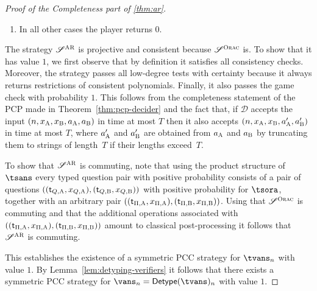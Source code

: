 \documentclass[11pt]{article}
\theoremstyle{definition}
\newcommand{\F}{\ensuremath{\mathbb{F}}}
\newcommand{\decider}{\mathcal{D}}
\newcommand{\strategy}{\mathscr{S}}
\newcommand{\gamestyle}[1]{\ensuremath{\textsc{#1}}\xspace}
\newcommand{\ora}{\gamestyle{Orac}}
\newcommand{\ar}{\gamestyle{AR}}
\newcommand{\labelstyle}[1]{\ensuremath{\textsc{#1}}\xspace}
\newcommand{\tvarstyle}[1]{\mathsf{#1}}
\newcommand{\tvar}{\ensuremath{\tvarstyle{t}}}
\newcommand{\alice}{\labelstyle{A}}
\newcommand{\bob}{\labelstyle{B}}
\newcommand{\typestyle}[1]{\ensuremath{\textsc{#1}}\xspace}
\newcommand{\Point}{\typestyle{Point}}
\newcommand{\ALine}{\typestyle{ALine}}
\newcommand{\DLine}{\typestyle{DLine}}
\newcommand{\tmstyle}[1]{\ensuremath{\mathsf{#1}}}
\newcommand{\detype}{\tmstyle{Detype}}
\begin{document}
\begin{proof}[Proof of the Completeness part of \cref{thm:ar}]
\begin{enumerate}
\begin{enumerate}
\begin{enumerate}
        $\DLine_i$ instead of $\ALine_i$) for $i \in \{1, \dots, 5\}$, the
        player returns the restriction of $g_i$ to the axis-parallel line (resp.
        diagonal line) of $\F_q^{m}$ specified by $x_\Pi$.
      \item If $\tvar_\Pi \in \{\Point_6, \ALine_6\}$ (resp.
        $\DLine_6$ instead of $\ALine_6$), the player returns the restriction of
        all the polynomials $g_1, \dots, g_5,$ $c_0, \dots, c_{m'}$ to the
        axis-parallel line of $\F_q^{m'}$ (resp.
        the diagonal line) specified by $x_\Pi$.
      \end{enumerate}
    \item In all other cases the player returns $0$.
    \end{enumerate}
  \end{enumerate}
  The strategy $\strategy^\ar$ is projective and consistent because $\strategy^\ora$
  is.
  To show that it has value $1$, we first observe that by definition it
  satisfies all consistency checks.
  Moreover, the strategy passes all low-degree tests with certainty because it
  always returns restrictions of consistent polynomials.
  Finally, it also passes the game check with probability $1$.
  This follows from the completeness statement of the PCP made in
  Theorem~\ref{thm:pcp-decider} and the fact that, if $\decider$ accepts the
  input $(n, x_\alice,x_\bob, a_\alice,a_\bob)$ in time at most $T$ then it also
  accepts $(n, x_\alice,x_\bob, a'_\alice,a'_\bob)$ in time at most $T$, where
  $a'_\alice$ and $a'_\bob$ are obtained from $a_\alice$ and $a_\bob$ by
  truncating them to strings of length~$T$ if their lengths exceed~$T$.

	To show that $\strategy^\ar$ is commuting, note that using the product structure
  of $\tsans$ every typed question pair with positive probability consists
  of a pair of questions $((\tvar_{Q,\alice},x_{Q, \alice}),(\tvar_{Q,\bob},
  x_{Q,\bob})) $ with positive probability for $\tsora$, together with an
  arbitrary pair $((\tvar_{\Pi,\alice},x_{\Pi, \alice}),
  (\tvar_{\Pi,\bob}, x_{\Pi,\bob}))$.
  Using that $\strategy^\ora$ is commuting and that the additional operations
  associated with $((\tvar_{\Pi,\alice},x_{\Pi, \alice}),
  (\tvar_{\Pi,\bob}, x_{\Pi,\bob}))$ amount to classical post-processing it
  follows that $\strategy^\ar$ is commuting.

  This establishes the existence of a symmetric PCC strategy for
  $\tvans_n$ with value $1$.
	By Lemma~\ref{lem:detyping-verifiers} it follows that there exists a symmetric
  PCC strategy for $\vans_n = \detype(\tvans)_n$ with value $1$.

\qedhere

\end{proof}
\end{document}
